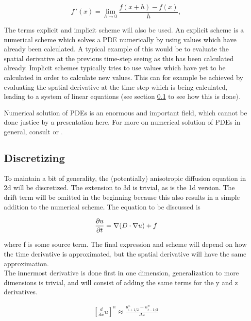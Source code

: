 \begin{equation}\label{derivative_definition}
 f\!\,'(x) = \lim_{h\to 0} \frac{f(x +h) - f(x)}{h},
\end{equation}

The terms explicit and implicit scheme will also be used. 
An explicit scheme is a numerical scheme which solves a PDE numerically by using values which have already been calculated. 
A typical example of this would be to evaluate the spatial derivative at the previous time-step seeing as this has been calculated already. 
Implicit schemes typically tries to use values which have yet to be calculated in order to calculate new values. 
This can for example be achieved by evaluating the spatial derivative at the time-step which is being calculated, leading to a system of linear equations (see section \ref{discretizing} to see how this is done).

Numerical solution of PDEs is an enormous and important field, which cannot be done justice by a presentation here. 
For more on numerical solution of PDEs in general, consult \cite{} or \cite{}.

\subsection{Discretizing}\label{discretizing}

To maintain a bit of generality, the (potentially) anisotropic diffusion equation in 2d will be discretized. 
The extension to 3d is trivial, as is the 1d version. 
The drift term will be omitted in the beginning because this also results in a simple addition to the numerical scheme. The equation to be discussed is 

\begin{equation}
 \frac{\partial u}{\partial t} = \nabla(D\cdot\nabla u) +f
\end{equation}

where f is some source term. 
The final expression and scheme will depend on how the time derivative is approximated, but the spatial derivative will have the same approximation. \\
The innermost derivative is done first in one dimension, generalization to more dimensions is trivial, and will consist of adding the same terms for the y and z derivatives. 

\begin{align*}
 \left[\frac{d}{dx}u\right]^n \approx \frac{u^n_{i+1/2}-u^n_{i-1/2}}{\Delta x}
\end{align*}

